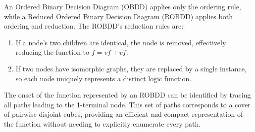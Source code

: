 An Ordered Binary Decision Diagram (OBDD) applies only the ordering rule, while a Reduced Ordered Binary Decision Diagram (ROBDD) applies both ordering and reduction. 
The ROBDD's reduction rules are:
\begin{enumerate}
    \item If a node's two children are identical, the node is removed, effectively reducing the function to $f = vf + \bar{v}f$. 
    \item If two nodes have isomorphic graphs, they are replaced by a single instance, so each node uniquely represents a distinct logic function.
\end{enumerate} 
The onset of the function represented by an ROBDD can be identified by tracing all paths leading to the 1-terminal node. 
This set of paths corresponds to a cover of pairwise disjoint cubes, providing an efficient and compact representation of the function without needing to explicitly enumerate every path.